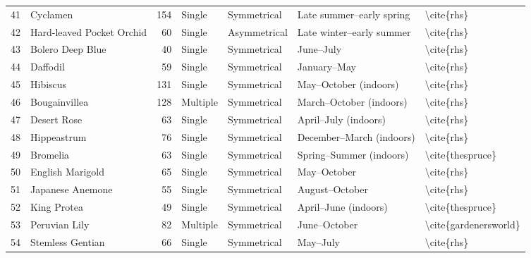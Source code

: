 \begin{table}
\begin{tabular}{rlrllll}
    41 &                  Cyclamen &          154 &      Single &  Symmetrical & Late summer–early spring &              \textbackslash cite\{rhs\} \\
    42 & Hard-leaved Pocket Orchid &           60 &      Single & Asymmetrical & Late winter–early summer &              \textbackslash cite\{rhs\} \\
    43 &          Bolero Deep Blue &           40 &      Single &  Symmetrical &                June–July &              \textbackslash cite\{rhs\} \\
    44 &                  Daffodil &           59 &      Single &  Symmetrical &              January–May &              \textbackslash cite\{rhs\} \\
    45 &                  Hibiscus &          131 &      Single &  Symmetrical &    May–October (indoors) &              \textbackslash cite\{rhs\} \\
    46 &             Bougainvillea &          128 &    Multiple &  Symmetrical &  March–October (indoors) &              \textbackslash cite\{rhs\} \\
    47 &               Desert Rose &           63 &      Single &  Symmetrical &     April–July (indoors) &              \textbackslash cite\{rhs\} \\
    48 &               Hippeastrum &           76 &      Single &  Symmetrical & December–March (indoors) &              \textbackslash cite\{rhs\} \\
    49 &                  Bromelia &           63 &      Single &  Symmetrical &  Spring–Summer (indoors) &        \textbackslash cite\{thespruce\} \\
    50 &          English Marigold &           65 &      Single &  Symmetrical &              May–October &              \textbackslash cite\{rhs\} \\
    51 &          Japanese Anemone &           55 &      Single &  Symmetrical &           August–October &              \textbackslash cite\{rhs\} \\
    52 &               King Protea &           49 &      Single &  Symmetrical &     April–June (indoors) &        \textbackslash cite\{thespruce\} \\
    53 &             Peruvian Lily &           82 &    Multiple &  Symmetrical &             June–October &   \textbackslash cite\{gardenersworld\} \\
    54 &          Stemless Gentian &           66 &      Single &  Symmetrical &                 May–July &              \textbackslash cite\{rhs\} \\

\end{tabular}
\end{table}
